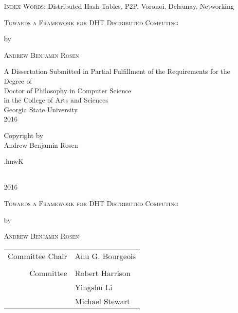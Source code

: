\documentclass[11pt,letterpaper]{report}
\begin{document}
		\vfill
		

		{\textsc{Index Words}: Distributed Hash Tables, P2P, Voronoi, Delaunay, Networking}
	
	
	\newpage 
	\begin{titlepage}
		
		\begin{center}
			{\scshape Towards a Framework for DHT Distributed Computing\par}
			\vspace{5cm}
			{by\par}
			\vspace{5cm}
			{\scshape Andrew Benjamin Rosen\par}
			
			\vfill
			A Dissertation Submitted in Partial Fulfillment of the Requirements for the Degree of\\
			Doctor of Philosophy in Computer Science\\
			in the College of Arts and Sciences\\
			Georgia State University\\
			2016
		\end{center}
	\end{titlepage}
	
	
	
	
	
	
	\null\vfill
	\begin{center}
		
		Copyright by \\
		Andrew Benjamin Rosen\\
		\begin{cjhebrew}
			.hnwK
		\end{cjhebrew}\\
		2016
	\end{center}
	\newpage
	


	\begin{center}
		{\scshape Towards a Framework for DHT Distributed Computing\par}
		\vspace{5cm}
		{by\par}
		\vspace{5cm}
		{\scshape Andrew Benjamin Rosen\par}
	\end{center}
	\vfill
	\hfill\begin{tabular}{rl}
		Committee Chair & Anu G. Bourgeois \\ 
		&  \\ 
		Committee & Robert Harrison  \\ 
		& Yingshu Li\\ 
		& Michael Stewart 
	\end{tabular} 
	
\end{document}
